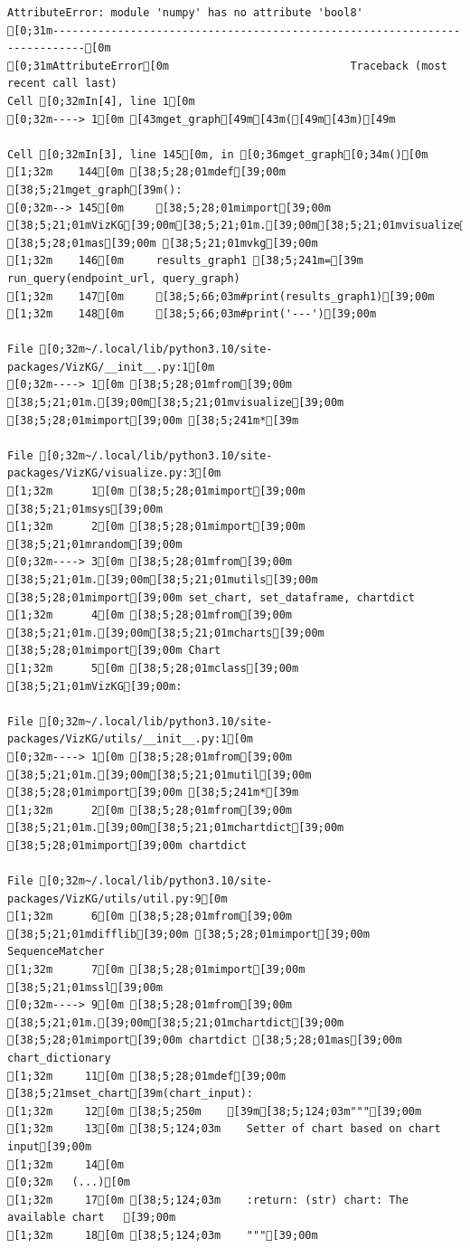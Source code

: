 \documentclass[
  letterpaper,
]{book}
\begin{document}
\begin{verbatim}
AttributeError: module 'numpy' has no attribute 'bool8'
[0;31m---------------------------------------------------------------------------[0m
[0;31mAttributeError[0m                            Traceback (most recent call last)
Cell [0;32mIn[4], line 1[0m
[0;32m----> 1[0m [43mget_graph[49m[43m([49m[43m)[49m

Cell [0;32mIn[3], line 145[0m, in [0;36mget_graph[0;34m()[0m
[1;32m    144[0m [38;5;28;01mdef[39;00m [38;5;21mget_graph[39m():
[0;32m--> 145[0m     [38;5;28;01mimport[39;00m [38;5;21;01mVizKG[39;00m[38;5;21;01m.[39;00m[38;5;21;01mvisualize[39;00m [38;5;28;01mas[39;00m [38;5;21;01mvkg[39;00m
[1;32m    146[0m     results_graph1 [38;5;241m=[39m run_query(endpoint_url, query_graph)
[1;32m    147[0m     [38;5;66;03m#print(results_graph1)[39;00m
[1;32m    148[0m     [38;5;66;03m#print('---')[39;00m

File [0;32m~/.local/lib/python3.10/site-packages/VizKG/__init__.py:1[0m
[0;32m----> 1[0m [38;5;28;01mfrom[39;00m [38;5;21;01m.[39;00m[38;5;21;01mvisualize[39;00m [38;5;28;01mimport[39;00m [38;5;241m*[39m

File [0;32m~/.local/lib/python3.10/site-packages/VizKG/visualize.py:3[0m
[1;32m      1[0m [38;5;28;01mimport[39;00m [38;5;21;01msys[39;00m
[1;32m      2[0m [38;5;28;01mimport[39;00m [38;5;21;01mrandom[39;00m
[0;32m----> 3[0m [38;5;28;01mfrom[39;00m [38;5;21;01m.[39;00m[38;5;21;01mutils[39;00m [38;5;28;01mimport[39;00m set_chart, set_dataframe, chartdict
[1;32m      4[0m [38;5;28;01mfrom[39;00m [38;5;21;01m.[39;00m[38;5;21;01mcharts[39;00m [38;5;28;01mimport[39;00m Chart
[1;32m      5[0m [38;5;28;01mclass[39;00m [38;5;21;01mVizKG[39;00m:

File [0;32m~/.local/lib/python3.10/site-packages/VizKG/utils/__init__.py:1[0m
[0;32m----> 1[0m [38;5;28;01mfrom[39;00m [38;5;21;01m.[39;00m[38;5;21;01mutil[39;00m [38;5;28;01mimport[39;00m [38;5;241m*[39m
[1;32m      2[0m [38;5;28;01mfrom[39;00m [38;5;21;01m.[39;00m[38;5;21;01mchartdict[39;00m [38;5;28;01mimport[39;00m chartdict

File [0;32m~/.local/lib/python3.10/site-packages/VizKG/utils/util.py:9[0m
[1;32m      6[0m [38;5;28;01mfrom[39;00m [38;5;21;01mdifflib[39;00m [38;5;28;01mimport[39;00m SequenceMatcher
[1;32m      7[0m [38;5;28;01mimport[39;00m [38;5;21;01mssl[39;00m
[0;32m----> 9[0m [38;5;28;01mfrom[39;00m [38;5;21;01m.[39;00m[38;5;21;01mchartdict[39;00m [38;5;28;01mimport[39;00m chartdict [38;5;28;01mas[39;00m chart_dictionary
[1;32m     11[0m [38;5;28;01mdef[39;00m [38;5;21mset_chart[39m(chart_input):
[1;32m     12[0m [38;5;250m    [39m[38;5;124;03m"""[39;00m
[1;32m     13[0m [38;5;124;03m    Setter of chart based on chart input[39;00m
[1;32m     14[0m 
[0;32m   (...)[0m
[1;32m     17[0m [38;5;124;03m    :return: (str) chart: The available chart   [39;00m
[1;32m     18[0m [38;5;124;03m    """[39;00m


\end{verbatim}
\end{document}
